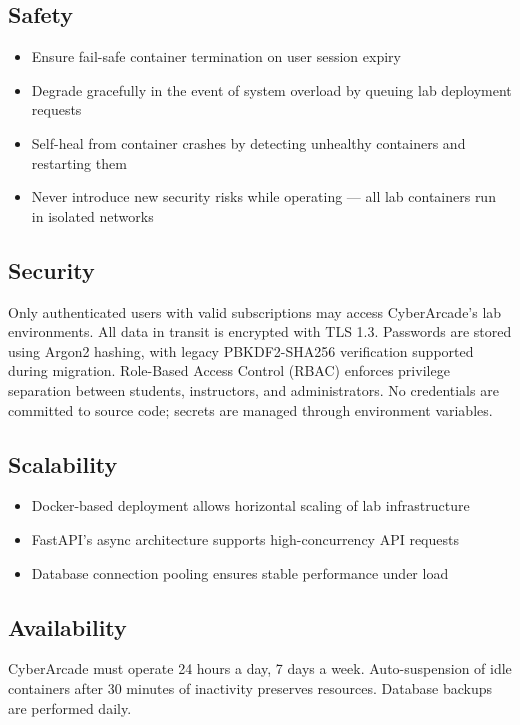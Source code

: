 \documentclass[12pt,a4paper]{report}
\begin{document}
\subsection{Safety}
\begin{itemize}
  \item Ensure fail-safe container termination on user session expiry
  \item Degrade gracefully in the event of system overload by queuing lab deployment requests
  \item Self-heal from container crashes by detecting unhealthy containers and restarting them
  \item Never introduce new security risks while operating --- all lab containers run in isolated networks
\end{itemize}

\subsection{Security}

Only authenticated users with valid subscriptions may access CyberArcade's lab environments. All data
in transit is encrypted with TLS 1.3. Passwords are stored using Argon2 hashing, with legacy PBKDF2-SHA256 verification supported during migration. Role-Based Access
Control (RBAC) enforces privilege separation between students, instructors, and administrators. No
credentials are committed to source code; secrets are managed through environment variables.

\subsection{Scalability}
\begin{itemize}
  \item Docker-based deployment allows horizontal scaling of lab infrastructure
  \item FastAPI's async architecture supports high-concurrency API requests
  \item Database connection pooling ensures stable performance under load
\end{itemize}

\subsection{Availability}

CyberArcade must operate 24 hours a day, 7 days a week. Auto-suspension of idle containers after
30 minutes of inactivity preserves resources. Database backups are performed daily.
\end{document}
